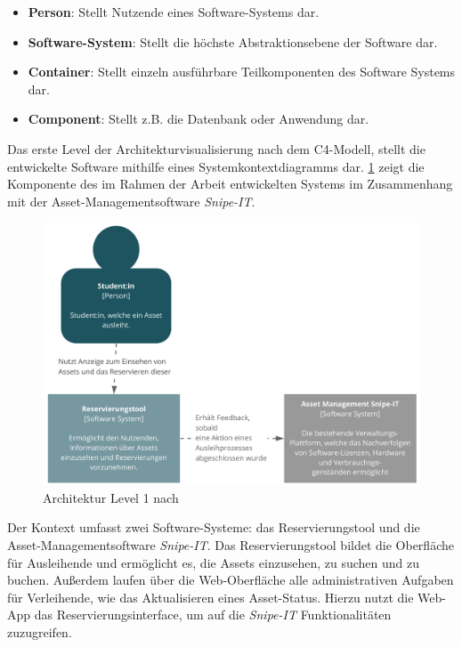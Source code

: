 \begin{itemize}
    \item \textbf{Person}: Stellt Nutzende eines Software-Systems dar.
    \item \textbf{Software-System}: Stellt die höchste Abstraktionsebene der
          Software dar.
    \item \textbf{Container}: Stellt einzeln ausführbare Teilkomponenten des
          Software Systems dar.
    \item \textbf{Component}: Stellt z.B. die Datenbank oder Anwendung dar.
\end{itemize}

{\sffamily\color{maincolor}{Level 1: Context}}

Das erste Level der Architekturvisualisierung nach dem C4-Modell, stellt die
entwickelte Software mithilfe eines Systemkontextdiagramms dar. \ref{fig:level1}
zeigt die Komponente des im Rahmen der Arbeit entwickelten Systems im
Zusammenhang mit der Asset-Managementsoftware \textit{Snipe-IT}.

\begin{figure}[h]
    \centering
    \includegraphics[scale=0.4]{Bilder/C4_1.pdf}
    \caption[Architektur Level 1]{Architektur Level 1 nach
        }
    \label{fig:level1}
\end{figure}

Der Kontext umfasst zwei Software-Systeme: das Reservierungstool und die Asset-Managementsoftware
\textit{Snipe-IT}. Das Reservierungstool bildet die Oberfläche für Ausleihende und ermöglicht es, die Assets
einzusehen, zu suchen und zu buchen. Außerdem laufen über die Web-Oberfläche alle administrativen
Aufgaben für Verleihende, wie das Aktualisieren eines Asset-Status. Hierzu nutzt die Web-App das
Reservierungsinterface, um auf die \textit{Snipe-IT} Funktionalitäten zuzugreifen.

